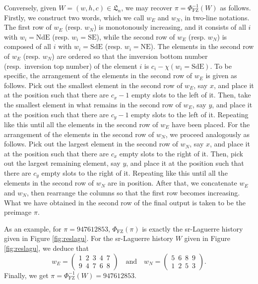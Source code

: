 \documentclass[12pt]{amsart}
\numberwithin{equation}{section}
\theoremstyle{plain}
\theoremstyle{definition}
\def\FZ{\mathrm{FZ}}
\def\LH{\mathfrak{L}}
\def\NE{\mathrm{NE}}
\def\SE{\mathrm{SE}}
\def\SdE{\mathrm{SdE}}
\def\NdE{\mathrm{NdE}}
\begin{document}
Conversely, given $W=(w,h,c) \in \LH_n$, we may recover $\pi=\Phi_{\FZ}^{-1}(W)$ as follows. Firstly, we construct two words, which we call $w_E$ and $w_N$, in two-line notations.
The first row of $w_E$ (resp. $w_N$) is monotonously increasing, and it consists of all $i$ with $w_i=\NdE$ (resp. $w_i=\SE$), while the second row of $w_E$ (resp. $w_N$) is composed of all $i$ with $w_i=\SdE$ (resp. $w_i=\NE$). The elements in the second row of $w_E$ (resp. $w_N$) are ordered so that the imversion bottom number (resp.~inversion top number) of the element $i$ is $c_{i}-\chi(w_{i}=\SdE)$. To be specific, the arrangement of the elements in the second row of $w_E$ is given as follows. Pick out the smallest element in the second row of $w_E$, say $x$, and place it at the position such that there are $c_x-1$ empty slots to the left of it. Then, take the smallest element in what remains in the second row of $w_E$, say $y$, and place it at the position such that there are $c_y-1$ empty slots to the left of it. Repeating like this until
all the elements in the second row of $w_E$ have been placed. For the arrangement of the elements in the second row of $w_N$, we proceed analogously as follows. Pick out the largest element in the second row of $w_N$, say $x$, and place it at the position such that there are $c_x$ empty slots to the right of it. Then, pick out the largest remaining element, say $y$, and place it at the position such that there are $c_y$ empty slots to the right of it. Repeating like this until
all the elements in the second row of $w_N$ are in position. After that, we concatenate $w_E$ and $w_N$, then rearrange the columns so that the first row becomes increasing. What we have obtained in the second row of the final output is taken to be the preimage $\pi$.

As an example, for $\pi=947612853$,  $\Phi_{\FZ}(\pi)$ is exactly the sr-Laguerre history given in Figure
\ref{fig:reslagu}. For the sr-Laguerre history $W$ given in Figure
\ref{fig:reslagu}, we deduce that
\begin{equation*}
w_E= \left(
  \begin{array}{ll}
1\,\,\,  2 \,\,\, 3 \,\,\, 4 \,\,\, 7\\[3pt]
9 \,\,\, 4 \,\,\, 7 \,\,\, 6 \,\,\, 8
 \end{array} \right)  \,\,\,\,\,\, \text{and} \,\,\,\,\,\,
 w_N= \left(
  \begin{array}{ll}
5\,\,\,  6 \,\,\, 8 \,\,\, 9\\[3pt]
1 \,\,\, 2 \,\,\, 5 \,\,\, 3
 \end{array} \right).
\end{equation*}
Finally, we get $\pi=\Phi_{\FZ}^{-1}(W)=947612853$.
\end{document}
